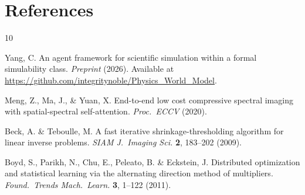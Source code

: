 \documentclass[11pt,a4paper]{article}
\begin{document}
\section*{References}

\begingroup
\renewcommand{\section}[2]{}
\begin{thebibliography}{10}

Yang, C.
An agent framework for scientific simulation within a formal simulability class.
\textit{Preprint} (2026).
Available at \url{https://github.com/integritynoble/Physics_World_Model}.

Meng, Z., Ma, J., \& Yuan, X.
End-to-end low cost compressive spectral imaging with spatial-spectral self-attention.
\textit{Proc.\ ECCV} (2020).

Beck, A. \& Teboulle, M.
A fast iterative shrinkage-thresholding algorithm for linear inverse problems.
\textit{SIAM J.\ Imaging Sci.} \textbf{2}, 183--202 (2009).

Boyd, S., Parikh, N., Chu, E., Peleato, B. \& Eckstein, J.
Distributed optimization and statistical learning via the alternating direction method of multipliers.
\textit{Found.\ Trends Mach.\ Learn.} \textbf{3}, 1--122 (2011).

\end{thebibliography}
\endgroup
\end{document}
